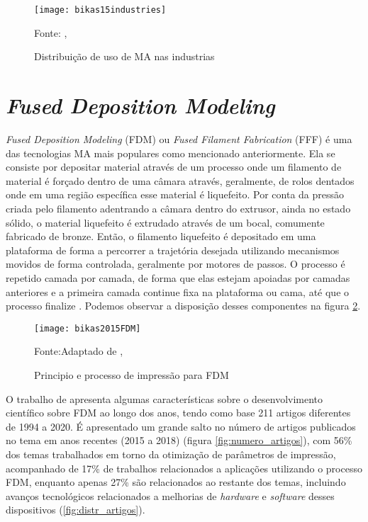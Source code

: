 \begin{figure}[H]
    \begin{center}
    \caption{Distribuição de uso de MA nas industrias}
    \texttt{[image: bikas15industries]}

    {\footnotesize Fonte: \citeauthor{bikas16}, \citeyear{bikas16}}
    \label{fig:MA_industrias}
    \end{center}
\end{figure}

\section{\textit{Fused Deposition Modeling}}
\textit{Fused Deposition Modeling} (FDM) ou \textit{Fused Filament Fabrication} 
(FFF) é uma das tecnologias MA mais populares como mencionado anteriormente.
Ela se consiste por depositar material através de um processo 
onde um filamento de material é forçado dentro de uma câmara através,
geralmente, de rolos dentados onde em uma região específica esse 
material é liquefeito. Por conta da pressão criada pelo filamento 
adentrando a câmara dentro do extrusor, ainda no estado sólido, 
o material liquefeito é extrudado através de um bocal, 
comumente fabricado de bronze. Então, o filamento liquefeito é 
depositado em uma plataforma de forma a percorrer a trajetória 
desejada utilizando mecanismos movidos de forma controlada, 
geralmente por motores de passos. O processo é repetido camada 
por camada, de forma que elas estejam apoiadas por camadas 
anteriores e a primeira camada continue fixa na plataforma ou 
cama, até que o processo finalize \cite{turner14}.
Podemos observar a disposição desses componentes na figura \ref{fig:fdm_ex}.

\begin{figure}[H]
    \begin{center}
    \caption{Principio e processo de impressão para FDM}
    \texttt{[image: bikas2015FDM]}

    {\footnotesize Fonte:Adaptado de \citeauthor{bikas16}, \citeyear{bikas16}}
    \label{fig:fdm_ex}
    \end{center}
\end{figure}

O trabalho de \cite{vyavahare20} apresenta algumas 
características sobre o desenvolvimento científico sobre 
FDM ao longo dos anos, tendo como base 211 artigos diferentes 
de 1994 a 2020. É apresentado um grande salto no número de 
artigos publicados no tema em anos recentes (2015 a 2018) 
(figura \ref{fig:numero_artigos}), com 56\% dos temas trabalhados em torno da 
otimização de parâmetros de impressão, acompanhado de 17\% de 
trabalhos relacionados a aplicações utilizando o processo FDM, enquanto apenas 27\%
são relacionados ao restante dos temas, incluindo avanços tecnológicos relacionados
a melhorias de \textit{hardware} e \textit{software} desses dispositivos (\ref{fig:distr_artigos}).

